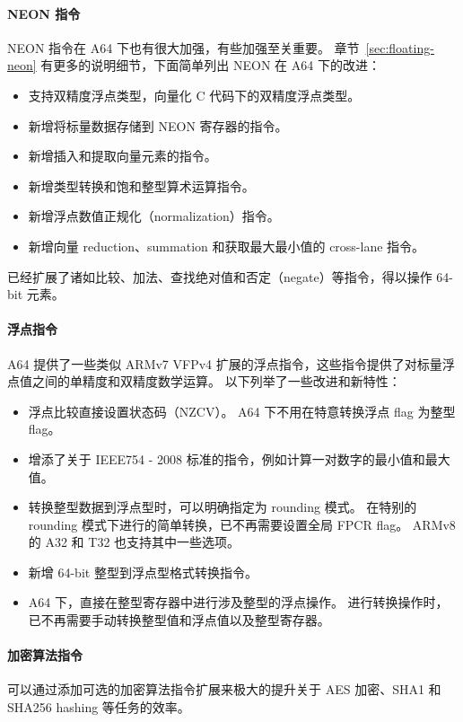 \paragraph*{NEON 指令}

NEON 指令在 A64 下也有很大加强，有些加强至关重要。
章节~\ref{sec:floating-neon} 有更多的说明细节，下面简单列出 NEON 在 A64 下的改进：

\begin{itemize}
  \item 支持双精度浮点类型，向量化 C 代码下的双精度浮点类型。
  \item 新增将标量数据存储到 NEON 寄存器的指令。
  \item 新增插入和提取向量元素的指令。
  \item 新增类型转换和饱和整型算术运算指令。
  \item 新增浮点数值正规化（normalization）指令。
  \item 新增向量 reduction、summation 和获取最大最小值的 cross-lane 指令。
\end{itemize}

已经扩展了诸如比较、加法、查找绝对值和否定（negate）等指令，得以操作 64-bit 元素。

\paragraph*{浮点指令}

A64 提供了一些类似 ARMv7 VFPv4 扩展的浮点指令，这些指令提供了对标量浮点值之间的单精度和双精度数学运算。
以下列举了一些改进和新特性：

\begin{itemize}
  \item 浮点比较直接设置状态码（NZCV）。
    A64 下不用在特意转换浮点 flag 为整型 flag。
  \item 增添了关于 IEEE754 - 2008 标准的指令，例如计算一对数字的最小值和最大值。
  \item 转换整型数据到浮点型时，可以明确指定为 rounding 模式。
    在特别的 rounding 模式下进行的简单转换，已不再需要设置全局 FPCR flag。
    ARMv8 的 A32 和 T32 也支持其中一些选项。
  \item 新增 64-bit 整型到浮点型格式转换指令。
  \item A64 下，直接在整型寄存器中进行涉及整型的浮点操作。
    进行转换操作时，已不再需要手动转换整型值和浮点值以及整型寄存器。
\end{itemize}

\paragraph*{加密算法指令}

可以通过添加可选的加密算法指令扩展来极大的提升关于 AES 加密、SHA1 和 SHA256 hashing 等任务的效率。

